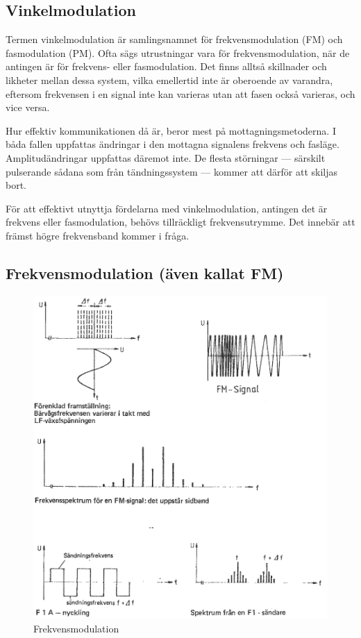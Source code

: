 \subsection{Vinkelmodulation}

Termen vinkelmodulation är samlingsnamnet för frekvensmodulation (FM) och
fasmodulation (PM).
Ofta sägs utrustningar vara för frekvensmodulation, när de antingen är för
frekvens- eller fasmodulation.
Det finns alltså skillnader och likheter mellan dessa system, vilka emellertid
inte är oberoende av varandra, eftersom frekvensen i en signal inte kan
varieras utan att fasen också varieras, och vice versa.

Hur effektiv kommunikationen då är, beror mest på mottagningsmetoderna.
I båda fallen uppfattas ändringar i den mottagna signalens frekvens och fasläge.
Amplitudändringar uppfattas däremot inte.
De flesta störningar --- särskilt pulserande sådana som från tändningssystem ---
kommer att därför att skiljas bort.

För att effektivt utnyttja fördelarna med vinkelmodulation, antingen det är
frekvens eller fasmodulation, behövs tillräckligt frekvensutrymme.
Det innebär att främst högre frekvensband kommer i fråga.

\subsection{Frekvensmodulation (även kallat FM)}

\begin{figure}
\includegraphics[width=\textwidth]{images/cropped_pdfs/bild_2_1-30.pdf}
\caption{Frekvensmodulation}
\label{fig:BildII1-30}
\end{figure}

